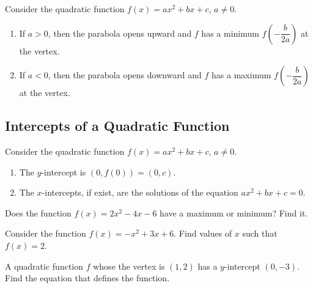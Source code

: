 Consider the quadratic function \(f(x)=ax^2+bx+c\), \(a\neq 0\).

\begin{enumerate}[sepno]
\item
  If \(a>0\), then the parabola opens upward and \(f\) has a minimum
  \(f\left(-\dfrac{b}{2a}\right)\) at the vertex.
\item
  If \(a<0\), then the parabola opens downward and \(f\) has a maximum
  \(f\left(-\dfrac{b}{2a}\right)\) at the vertex.
\end{enumerate}

\hypertarget{intercepts-of-a-quadratic-function}{%
\subsection{Intercepts of a Quadratic
Function}\label{intercepts-of-a-quadratic-function}}

Consider the quadratic function \(f(x)=ax^2+bx+c\), \(a\neq 0\).

\begin{enumerate}[sepno]
\item
  The \(y\)-intercept is \((0, f(0))=(0, c)\).
\item
  The \(x\)-intercepts, if exist, are the solutions of the equation
  \(ax^2+bx+c=0\).
\end{enumerate}

\begin{example}

Does the function \(f(x)=2x^2-4x-6\) have a maximum or minimum? Find it.

\end{example}
\vspace*{6\baselineskip}

\begin{example}

Consider the function \(f(x)=-x^2+3x+6\). Find values of \(x\) such that
\(f(x)=2\).

\end{example}
\vspace*{6\baselineskip}

\begin{example}

A quadratic function \(f\) whose the vertex is \((1, 2)\) has a
\(y\)-intercept \((0, -3)\). Find the equation that defines the
function.

\end{example}
\vspace*{6\baselineskip}

